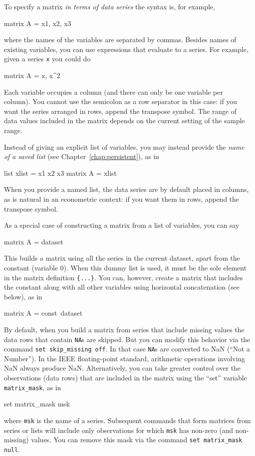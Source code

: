 To specify a matrix \textit{in terms of data series} the syntax is,
for example,
%
\begin{code}
matrix A = {x1, x2, x3}
\end{code}
%
where the names of the variables are separated by commas.  Besides
names of existing variables, you can use expressions that evaluate to
a series.  For example, given a series \texttt{x} you could do
%
\begin{code}
matrix A = {x, x^2}
\end{code}
%
Each variable occupies a column (and there can only be one variable
per column).  You cannot use the semicolon as a row separator in this
case: if you want the series arranged in rows, append the transpose
symbol.  The range of data values included in the matrix depends on
the current setting of the sample range.

Instead of giving an explicit list of variables, you may instead
provide the \textit{name of a saved list} (see
Chapter~\ref{chap:persistent}), as in
%
\begin{code}
list xlist = x1 x2 x3
matrix A = {xlist}
\end{code}
%
When you provide a named list, the data series are by default placed
in columns, as is natural in an econometric context: if you want them
in rows, append the transpose symbol.

As a special case of constructing a matrix from a list of variables,
you can say
%
\begin{code}
matrix A = {dataset}
\end{code}
%
This builds a matrix using all the series in the current dataset,
apart from the constant (variable 0).  When this dummy list is used, it
must be the sole element in the matrix definition \texttt{\{...\}}.  You
can, however, create a matrix that includes the constant along with
all other variables using horizontal concatenation (see below), as in
%
\begin{code}
matrix A = {const}~{dataset}
\end{code}
%

By default, when you build a matrix from series that include missing
values the data rows that contain \texttt{NA}s are skipped.  But you
can modify this behavior via the command \texttt{set skip\_missing
  off}.  In that case \texttt{NA}s are converted to NaN (``Not a
Number'').  In the IEEE floating-point standard, arithmetic operations
involving NaN always produce NaN. Alternatively, you can take greater
control over the observations (data rows) that are included in 
the matrix using the ``set'' variable \texttt{matrix\_mask}, as in
%
\begin{code}
set matrix_mask msk
\end{code}
%
where \texttt{msk} is the name of a series.  Subsequent commands that
form matrices from series or lists will include only observations
for which \texttt{msk} has non-zero (and non-missing) values. You
can remove this mask via the command \texttt{set matrix\_mask null}.

